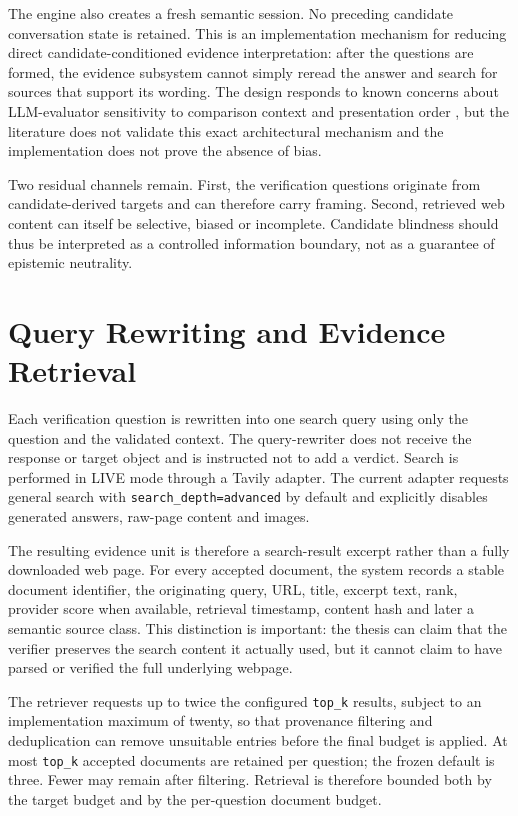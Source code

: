 The engine also creates a fresh semantic session. No preceding candidate conversation state is retained. This is an implementation mechanism for reducing direct candidate-conditioned evidence interpretation: after the questions are formed, the evidence subsystem cannot simply reread the answer and search for sources that support its wording. The design responds to known concerns about LLM-evaluator sensitivity to comparison context and presentation order \parencite{zheng2023llmjudge,wang2024notfairevaluators}, but the literature does not validate this exact architectural mechanism and the implementation does not prove the absence of bias.

Two residual channels remain. First, the verification questions originate from candidate-derived targets and can therefore carry framing. Second, retrieved web content can itself be selective, biased or incomplete. Candidate blindness should thus be interpreted as a controlled information boundary, not as a guarantee of epistemic neutrality.

\section{Query Rewriting and Evidence Retrieval}
\label{sec:retrieval}

Each verification question is rewritten into one search query using only the question and the validated context. The query-rewriter does not receive the response or target object and is instructed not to add a verdict. Search is performed in LIVE mode through a Tavily adapter. The current adapter requests general search with \texttt{search\_depth=advanced} by default and explicitly disables generated answers, raw-page content and images.

The resulting evidence unit is therefore a search-result excerpt rather than a fully downloaded web page. For every accepted document, the system records a stable document identifier, the originating query, URL, title, excerpt text, rank, provider score when available, retrieval timestamp, content hash and later a semantic source class. This distinction is important: the thesis can claim that the verifier preserves the search content it actually used, but it cannot claim to have parsed or verified the full underlying webpage.

The retriever requests up to twice the configured \texttt{top\_k} results, subject to an implementation maximum of twenty, so that provenance filtering and deduplication can remove unsuitable entries before the final budget is applied. At most \texttt{top\_k} accepted documents are retained per question; the frozen default is three. Fewer may remain after filtering. Retrieval is therefore bounded both by the target budget and by the per-question document budget.

